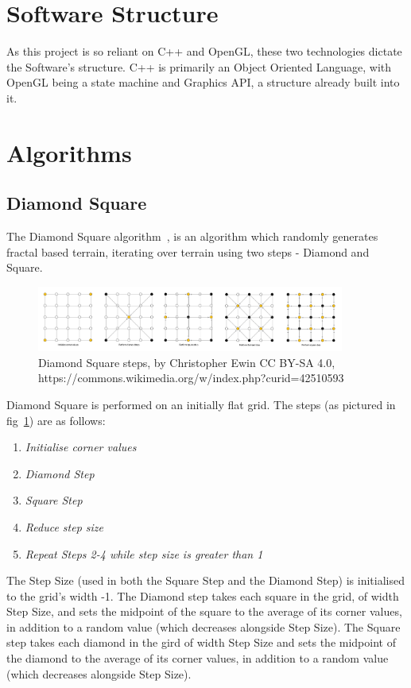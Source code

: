 \documentclass[a4paper,10pt]{report}
\begin{document}
\section{Software Structure}
As this project is so reliant on C++ and OpenGL, these two technologies dictate the Software's structure. C++ is primarily an Object Oriented Language, with OpenGL being a state machine and Graphics API, a structure already built into it. 
\section{Algorithms}
\subsection{Diamond Square}
The Diamond Square algorithm~\cite{miller1986definition}, is an algorithm which randomly generates fractal based terrain, iterating over terrain using two steps - Diamond and Square. \medskip 

\begin{figure}[h!]
    \centering
  \includegraphics[width=0.9\textwidth]{Diamond_Square}
 \caption[Diamond Square steps, by Christopher Ewin]{Diamond Square steps, by Christopher Ewin CC BY-SA 4.0, https://commons.wikimedia.org/w/index.php?curid=42510593}
 \label{fig:diamond_square_steps}
\end{figure} 

Diamond Square is performed on an initially flat grid. The steps (as pictured in fig~\ref{fig:diamond_square_steps}) are as follows:

\begin{enumerate}
\item \textit{Initialise corner values}
\item \textit{Diamond Step}
\item \textit{Square Step}
\item \textit{Reduce step size} 
\item \textit{Repeat Steps 2-4 while step size is greater than 1}
\end{enumerate} 

The Step Size (used in both the Square Step and the Diamond Step) is initialised to the grid's width -1. The Diamond step takes each square in the grid, of width Step Size, and sets the midpoint of the square to the average of its corner values, in addition to a random value (which decreases alongside Step Size). The Square step takes each diamond in the gird of width Step Size and sets the midpoint of the diamond to the average of its corner values, in addition to a random value (which decreases alongside Step Size). \medskip
\end{document}
